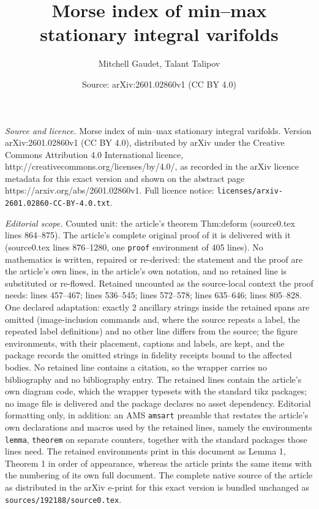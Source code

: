 \documentclass[10pt,a4paper]{amsart}
\title{Morse index of min--max stationary integral varifolds}
\author{Mitchell Gaudet, Talant Talipov}
\date{Source: arXiv:2601.02860v1 (CC BY 4.0)}
\begin{document}
\maketitle

\noindent\emph{Source and licence.} Morse index of min--max stationary integral varifolds. Version arXiv:2601.02860v1 (CC BY 4.0), distributed by arXiv under the Creative Commons Attribution 4.0 International licence, http://creativecommons.org/licenses/by/4.0/, as recorded in the arXiv licence metadata for this exact version and shown on the abstract page https://arxiv.org/abs/2601.02860v1. Full licence notice: \texttt{licenses/arxiv-2601.02860-CC-BY-4.0.txt}.\par\smallskip

\noindent\textit{Editorial scope.} Counted unit: the article's theorem Thm:deform (source0.tex lines 864--875). The article's complete original proof of it is delivered with it (source0.tex lines 876--1280, one \texttt{proof} environment of 405 lines). No mathematics is written, repaired or re-derived: the statement and the proof are the article's own lines, in the article's own notation, and no retained line is substituted or re-flowed.  Retained uncounted as the source-local context the proof needs: lines 457--467; lines 536--545; lines 572--578; lines 635--646; lines 805--828.  One declared adaptation: exactly 2 ancillary strings inside the retained spans are omitted (image-inclusion commands and, where the source repeats a label, the repeated label definitions) and no other line differs from the source; the figure environments, with their placement, captions and labels, are kept, and the package records the omitted strings in fidelity receipts bound to the affected bodies.  No retained line contains a citation, so the wrapper carries no bibliography and no bibliography entry.  The retained lines contain the article's own diagram code, which the wrapper typesets with the standard tikz packages; no image file is delivered and the package declares no asset dependency.  Editorial formatting only, in addition: an AMS \texttt{amsart} preamble that restates the article's own declarations and macros used by the retained lines, namely the environments \texttt{lemma}, \texttt{theorem} on separate counters, together with the standard packages those lines need.  The retained environments print in this document as Lemma 1, Theorem 1 in order of appearance, whereas the article prints the same items with the numbering of its own full document.  The complete native source of the article as distributed in the arXiv e-print for this exact version is bundled unchanged as \texttt{sources/192188/source0.tex}.
\end{document}
